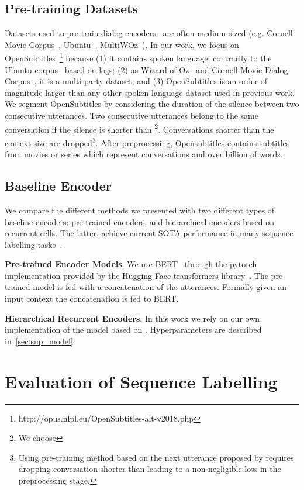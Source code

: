 \documentclass[11pt,a4paper]{article}
\begin{document}
\subsection{Pre-training Datasets}
Datasets used to pre-train dialog encoders~\cite{emotion_transfert,mehri2019pretraining} are often medium-sized (e.g. Cornell Movie Corpus~\cite{cornell}, Ubuntu~\cite{ubuntu}, MultiWOz~\cite{multiwoz}).
In our work, we focus on OpenSubtitles~\cite{opensub}\footnote{http://opus.nlpl.eu/OpenSubtitles-alt-v2018.php} because (1) it contains spoken language, contrarily to the Ubuntu corpus~\cite{ubuntu} based on logs; (2) as Wizard of Oz~\cite{multiwoz} and Cornell Movie Dialog Corpus~\cite{cornell}, it is a multi-party dataset; and (3) OpenSubtitles is an order of magnitude larger than any other spoken language dataset used in previous work.
We segment OpenSubtitles by considering the duration of the silence between two consecutive utterances. Two consecutive utterances belong to the same conversation if the silence is shorter than \footnote{We choose }. Conversations shorter than the context size  are dropped\footnote{Using pre-training method based on the next utterance proposed by \citet{mehri2019pretraining} requires dropping conversation shorter than  leading to a non-negligible loss in the preprocessing stage.}. After preprocessing, Opensubtitles contains subtitles from  movies or series which represent  conversations and over  billion of words. 

\subsection{Baseline Encoder}
We compare the different methods we presented with two different types of baseline encoders: pre-trained encoders, and hierarchical encoders based on recurrent cells. The latter, achieve current SOTA performance in many sequence labelling tasks~\cite{sota_swda_1,colombo2020guiding,self_attention}.

\noindent\textbf{Pre-trained Encoder Models}.
We use BERT~\cite{bert} through the pytorch implementation provided by the Hugging Face transformers library~\cite{Wolf2019HuggingFacesTS}. The pre-trained model is fed with a concatenation of the utterances. Formally given an input context  the concatenation  is fed to BERT. 

\noindent\textbf{Hierarchical Recurrent Encoders}. In this work we rely on our own implementation of the model based on . Hyperparameters are described in~\autoref{sec:sup_model}. 
\section{Evaluation of Sequence Labelling}
\end{document}

